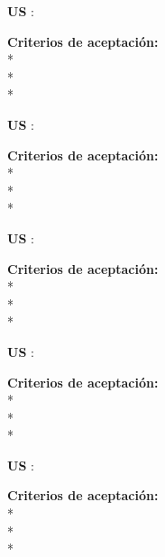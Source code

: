 \begin{tcolorbox}
\textbf{US }: %

\vline

\textbf{Criterios de aceptación:}\\
* \\ %
* \\ %
* \\ %
\end{tcolorbox}
\vspace{10pt}

\begin{tcolorbox}
\textbf{US }: %

\vline

\textbf{Criterios de aceptación:}\\
* \\ %
* \\ %
* \\ %
\end{tcolorbox}
\vspace{10pt}

\begin{tcolorbox}
\textbf{US }: %

\vline

\textbf{Criterios de aceptación:}\\
* \\ %
* \\ %
* \\ %
\end{tcolorbox}
\vspace{10pt}

\begin{tcolorbox}
\textbf{US }: %

\vline

\textbf{Criterios de aceptación:}\\
* \\ %
* \\ %
* \\ %
\end{tcolorbox}
\vspace{10pt}

\begin{tcolorbox}
\textbf{US }: %

\vline

\textbf{Criterios de aceptación:}\\
* \\ %
* \\ %
* \\ %
\end{tcolorbox}
\vspace{10pt}

